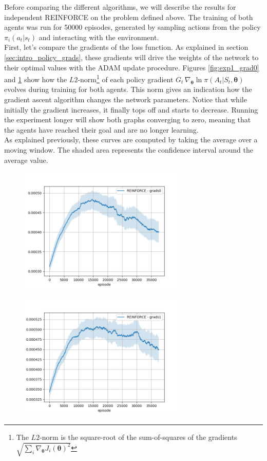 Before comparing the different algorithms, we will describe the results for independent REINFORCE on the problem defined above. The training of both agents was run for 50000 episodes, generated by sampling actions from the policy $\pi_i(a_t|s_t)$ and interacting with the environment.\\
First, let's compare the gradients of the loss function. As explained in section \ref{sec:intro_policy_grads}, these gradients will drive the weights of the network to their optimal values with the ADAM update procedure. Figures \ref{fig:exp1_grad0} and \ref{fig:exp1_grad1} show how the $L2$-norm\footnote{The $L2$-norm is the square-root of the sum-of-squares of the gradients $\sqrt{\sum_i \nabla_{\bm{\theta}} J_{i}(\bm{\theta})^2}$}  of each policy gradient $G_t \, \nabla_{\bm{\theta}} \ln \pi(A_t|S_t,\bm{\theta})$ evolves during training for both agents. This norm gives an indication how the gradient ascent algorithm changes the network parameters. Notice that while initially the gradient increases, it finally tops off and starts to decrease. Running the experiment longer will show both graphs converging to zero, meaning that the agents have reached their goal and are no longer learning.\\
As explained previously, these curves are computed by taking the average over a moving window. The shaded area represents the confidence interval around the average value.
\begin{figure}
\centering
\begin{minipage}{.5\textwidth}
  \centering
  \includegraphics[width=8cm]{images/experiment4/grad0.png}
  \label{fig:exp1_grad0}
\end{minipage}%
\begin{minipage}{.5\textwidth}
  \centering
  \includegraphics[width=8cm]{images/experiment4/grad1.png}
  \label{fig:exp1_grad1}
\end{minipage}
\end{figure}

